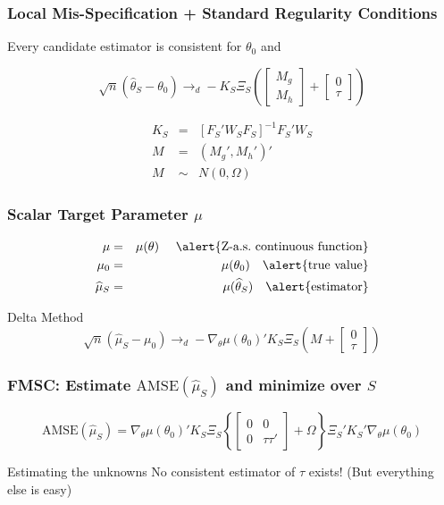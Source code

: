 \begin{frame}
\frametitle{Local Mis-Specification + Standard Regularity Conditions}

\alert{Every candidate estimator} is consistent for $\theta_0$ and

$$\sqrt{n}(\widehat{\theta}_S - \theta_0 ) \rightarrow_d -K_S \Xi_S  \left(\left[\begin{array}
	{c} M_g \\ M_h
\end{array} \right]  + \left[\begin{array}
	{c} 0 \\ \tau
\end{array} \right]\right)$$

\begin{eqnarray*}
	K_S &=&[F_S'W_SF_S]^{-1} F_S'W_S\\
	M&=&(M_g', M_h')'\\
	M&\sim&N(0,\Omega)
\end{eqnarray*}
\end{frame}
\begin{frame}
\frametitle{Scalar Target Parameter $\mu$}
\begin{eqnarray*}
	\mu &=& \mu(\theta) \quad \mbox{ \alert{Z-a.s.\ continuous function}}\\
	\mu_0 &=& \mu(\theta_0) \quad \mbox{\alert{true value}}\\
	\widehat{\mu}_S &=& \mu(\widehat{\theta}_S) \quad \mbox{\alert{estimator}}
\end{eqnarray*}

\begin{block}
	{Delta Method}
$$\sqrt{n}\left(\widehat{\mu}_S - \mu_0\right)\rightarrow_d-\nabla_\theta\mu(\theta_0)'K_S \Xi_S \left(M +  \left[\begin{array}
	{c} 0 \\ \tau
\end{array} \right]\right)$$ 
\end{block}

\end{frame}

\begin{frame}
	\frametitle{FMSC: Estimate $\mbox{AMSE}(\widehat{\mu}_S)$ and minimize over $S$}

	$$\mbox{AMSE}\left(\widehat{\mu}_S\right) = \nabla_\theta\mu(\theta_0)'K_S \Xi_S \left\{\left[\begin{array}{cc}0&0\\0&\tau\tau'\end{array}\right] + \Omega\right\}\Xi_S'K_S'\nabla_\theta\mu(\theta_0)$$
	
	\begin{block}{Estimating the unknowns}
	No consistent estimator of $\tau$ exists! (But everything else is easy)
	\end{block}
\end{frame}

